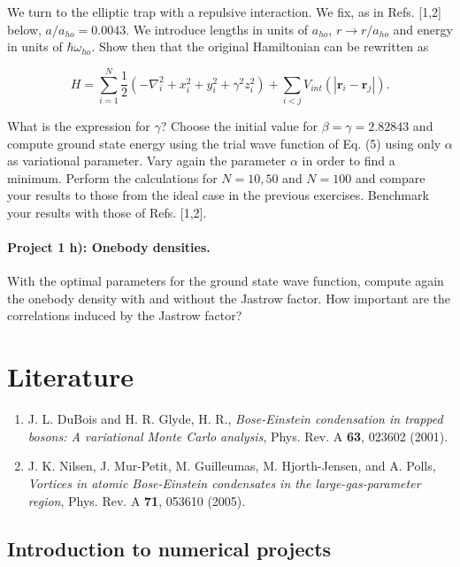 \documentclass[%
oneside,                 %
final,                   %
10pt]{article}
\begin{document}
We turn to the elliptic trap with a repulsive
   interaction.  We fix, as in Refs. [1,2] below,
   $a/a_{ho}=0.0043$. We introduce lengths in units of $a_{ho}$,
   $r\rightarrow r/a_{ho}$ and energy in units of $\hbar\omega_{ho}$.
   Show then that the original Hamiltonian can be rewritten as

\begin{equation*} 
    H=\sum_{i=1}^N\frac{1}{2}\left(-\nabla^2_i+x_i^2+y_i^2+\gamma^2z_i^2\right)+\sum_{i<j}V_{int}(|\mathbf{r}_i-\mathbf{r}_j|).
 \end{equation*}

What is the expression for $\gamma$?  Choose the initial value for
 $\beta=\gamma = 2.82843$ and compute 
 ground state energy using the trial wave function of
 Eq. (5)  using only $\alpha$ as variational
 parameter.  Vary again the parameter
 $\alpha$ in order to find a minimum.
 Perform the calculations for
 $N=10,50$ and $N=100$ and compare your results to those from the
 ideal case in the previous exercises.  Benchmark your results with
 those of Refs. [1,2].

\paragraph{Project 1 h): Onebody densities.}
With the optimal parameters for the ground state wave function,
compute again the onebody density with and without the Jastrow factor.
How important are the correlations induced by the Jastrow factor?

\section{Literature}

\begin{enumerate}
 \item J. L. DuBois and H. R. Glyde, H. R., \emph{Bose-Einstein condensation in trapped bosons: A variational Monte Carlo analysis}, Phys. Rev. A \textbf{63}, 023602 (2001).

 \item J. K. Nilsen,  J. Mur-Petit, M. Guilleumas, M. Hjorth-Jensen, and A. Polls, \emph{Vortices in atomic Bose-Einstein condensates in the large-gas-parameter region}, Phys. Rev. A \textbf{71}, 053610 (2005).
\end{enumerate}

\noindent
\subsection{Introduction to numerical projects}
\end{document}
